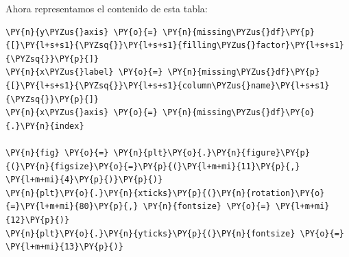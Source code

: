     Ahora representamos el contenido de esta tabla:

    \begin{tcolorbox}[breakable, size=fbox, boxrule=1pt, pad at break*=1mm,colback=cellbackground, colframe=cellborder]
\begin{Verbatim}[commandchars=\\\{\}]
\PY{n}{y\PYZus{}axis} \PY{o}{=} \PY{n}{missing\PYZus{}df}\PY{p}{[}\PY{l+s+s1}{\PYZsq{}}\PY{l+s+s1}{filling\PYZus{}factor}\PY{l+s+s1}{\PYZsq{}}\PY{p}{]} 
\PY{n}{x\PYZus{}label} \PY{o}{=} \PY{n}{missing\PYZus{}df}\PY{p}{[}\PY{l+s+s1}{\PYZsq{}}\PY{l+s+s1}{column\PYZus{}name}\PY{l+s+s1}{\PYZsq{}}\PY{p}{]}
\PY{n}{x\PYZus{}axis} \PY{o}{=} \PY{n}{missing\PYZus{}df}\PY{o}{.}\PY{n}{index}

\PY{n}{fig} \PY{o}{=} \PY{n}{plt}\PY{o}{.}\PY{n}{figure}\PY{p}{(}\PY{n}{figsize}\PY{o}{=}\PY{p}{(}\PY{l+m+mi}{11}\PY{p}{,} \PY{l+m+mi}{4}\PY{p}{)}\PY{p}{)}
\PY{n}{plt}\PY{o}{.}\PY{n}{xticks}\PY{p}{(}\PY{n}{rotation}\PY{o}{=}\PY{l+m+mi}{80}\PY{p}{,} \PY{n}{fontsize} \PY{o}{=} \PY{l+m+mi}{12}\PY{p}{)}
\PY{n}{plt}\PY{o}{.}\PY{n}{yticks}\PY{p}{(}\PY{n}{fontsize} \PY{o}{=} \PY{l+m+mi}{13}\PY{p}{)}


\end{Verbatim}
\end{tcolorbox}
